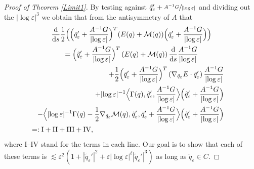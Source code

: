 \documentclass[JEP,XML,SOM,Unicode,published]{cedram}
\let\epsilon\varepsilon
\newcommand{\rI}{\mathrm{I}}
\newcommand{\rII}{\mathrm{II}}
\newcommand{\rIII}{\mathrm{III}}
\newcommand{\rIV}{\mathrm{IV}}
\theoremstyle{definition}
\let\eps\epsilon
\let\mel\relax
\begin{document}
\begin{proof}[Proof of Theorem \ref{Limit1}]
By testing against $\tilde{q}_\eps'+\sfrac{A^{-1}G}{|{\log\eps}|}$ and dividing out the $|{\log\eps}|^3$ we obtain that from the antisymmetry of $A$ that\vspace*{-5pt}
\begin{multline}\label{mod energy}
\mel\frac{\text{d}}{\text{d}s}\frac{1}{2} \Bigl(\Bigl(\tilde{q}_\eps'+\frac{A^{-1}G}{|{\log\eps}|} \Bigr)^T(E(q)+\mathcal{M}(q)) \Bigl(\tilde{q}_\eps'+\frac{A^{-1}G}{|{\log\eps}|} \Bigr) \Bigr)\\
= \Bigl(\tilde{q}_\eps'+\frac{A^{-1}G}{|{\log\eps}|} \Bigr)^T\left(E(q)+\mathcal{M}(q)\right)\frac{\text{d}}{\text{d}s}\frac{A^{-1}G}{|{\log\eps}|}\\
\shoveright{+\frac{1}{2} \Bigl(\tilde{q}_\eps'+\frac{A^{-1}G}{|{\log\eps}|} \Bigr)^T\left(\nabla_{\tilde{q}_\eps}E\cdot\tilde{q}_\eps'\right)\frac{A^{-1}G}{|{\log\eps}|}}\\
\shoveright{+|{\log\eps}|^{-1} \Bigl\langle \Gamma(q),\tilde{q}_\eps',\frac{A^{-1}G}{|{\log\eps}|} \Bigr\rangle \Bigl(\tilde{q}_\eps'+\frac{A^{-1}G}{|{\log\eps}|} \Bigr)}\\
\shoveright{-\Bigl\langle|{\log\eps}|^{-1} \Gamma(q)-\frac{1}{2}\nabla_{\tilde{q}_\eps}\mathcal{M}(q),\tilde{q}_\eps',\tilde{q}_\eps'+\frac{A^{-1}G}{|{\log\eps}|} \Bigr\rangle \Bigl(\tilde{q}_\eps'+\frac{A^{-1}G}{|{\log\eps}|} \Bigr)}\\
=: \rI+\rII+\rIII+\rIV,\hspace*{6.85cm}
\end{multline}
where $\rI$--$\rIV$ stand for the terms in each line. Our goal is to show that each of these terms is $\lesssim \eps^2(1+|\tilde{q}_\eps'|^2+\eps|{\log\eps}|^\ell|\tilde{q}_\eps'|^3)$ as long as $\tilde{q}_\eps\in C$.


\end{proof}
\end{document}
